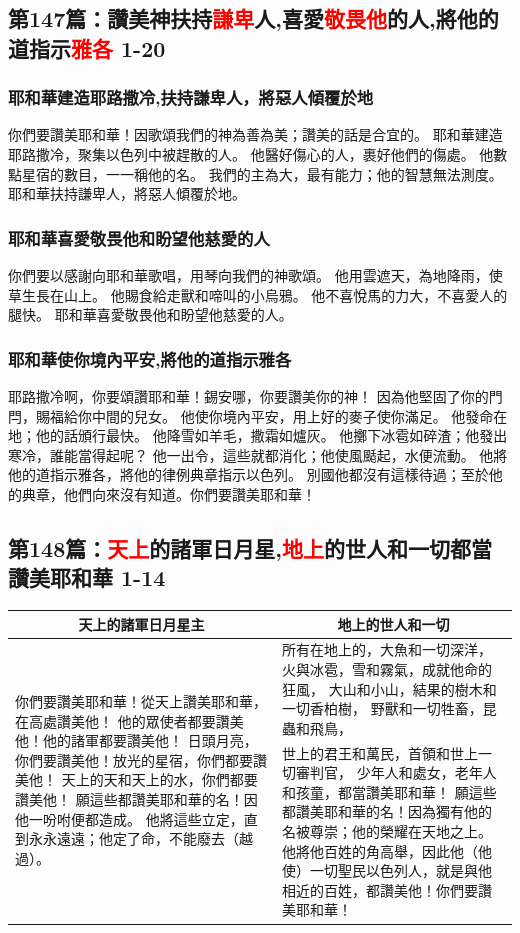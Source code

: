 \subsection{第147篇：讚美神扶持\textcolor{red}{謙卑}人,喜愛\textcolor{red}{敬畏他}的人,將他的道指示\textcolor{red}{雅各} 1-20}
\subsubsection{耶和華建造耶路撒冷,扶持謙卑人，將惡人傾覆於地}
你們要讚美耶和華！因歌頌我們的神為善為美；讚美的話是合宜的。
耶和華建造耶路撒冷，聚集以色列中被趕散的人。
他醫好傷心的人，裹好他們的傷處。
他數點星宿的數目，一一稱他的名。
我們的主為大，最有能力；他的智慧無法測度。
耶和華扶持謙卑人，將惡人傾覆於地。
\subsubsection{耶和華喜愛敬畏他和盼望他慈愛的人}
你們要以感謝向耶和華歌唱，用琴向我們的神歌頌。
他用雲遮天，為地降雨，使草生長在山上。
他賜食給走獸和啼叫的小烏鴉。
他不喜悅馬的力大，不喜愛人的腿快。
耶和華喜愛敬畏他和盼望他慈愛的人。
\subsubsection{耶和華使你境內平安,將他的道指示雅各}
耶路撒冷啊，你要頌讚耶和華！錫安哪，你要讚美你的神！
因為他堅固了你的門閂，賜福給你中間的兒女。
他使你境內平安，用上好的麥子使你滿足。
他發命在地；他的話頒行最快。
他降雪如羊毛，撒霜如爐灰。
他擲下冰雹如碎渣；他發出寒冷，誰能當得起呢？
他一出令，這些就都消化；他使風颳起，水便流動。
他將他的道指示雅各，將他的律例典章指示以色列。
別國他都沒有這樣待過；至於他的典章，他們向來沒有知道。你們要讚美耶和華！



\subsection{第148篇：\textcolor{red}{天上}的諸軍日月星,\textcolor{red}{地上}的世人和一切都當讚美耶和華 1-14}
\begin{table}[H]
\centering
\begin{tabular}{p{6.9cm}|p{11.00cm}}\hline\hline
\multicolumn{1}{c|}{天上的諸軍日月星主}&\multicolumn{1}{c}{地上的世人和一切}\\\hline
\multirow{2}{7.1cm}{你們要讚美耶和華！從天上讚美耶和華，在高處讚美他！
他的眾使者都要讚美他！他的諸軍都要讚美他！
日頭月亮，你們要讚美他！放光的星宿，你們都要讚美他！
天上的天和天上的水，你們都要讚美他！
願這些都讚美耶和華的名！因他一吩咐便都造成。
他將這些立定，直到永永遠遠；他定了命，不能廢去（越過）。}
&所有在地上的，大魚和一切深洋，
火與冰雹，雪和霧氣，成就他命的狂風，
大山和小山，結果的樹木和一切香柏樹，
野獸和一切牲畜，昆蟲和飛鳥，\\\cline{2-2}
&世上的君王和萬民，首領和世上一切審判官，
少年人和處女，老年人和孩童，都當讚美耶和華！
願這些都讚美耶和華的名！因為獨有他的名被尊崇；他的榮耀在天地之上。
他將他百姓的角高舉，因此他（他使）一切聖民以色列人，就是與他相近的百姓，都讚美他！你們要讚美耶和華！\\\hline
\end{tabular}
\end{table} 


